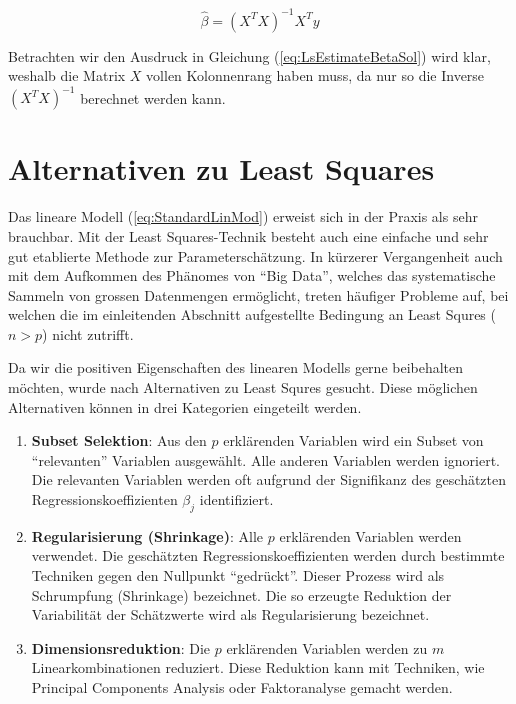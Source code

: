 \documentclass[]{book}
\providecommand{\tightlist}{%
  \setlength{\itemsep}{0pt}\setlength{\parskip}{0pt}}
\begin{document}
\begin{equation}
\hat{\beta} = (X^TX)^{-1}X^Ty
\label{eq:LsEstimateBetaSol}
\end{equation}

Betrachten wir den Ausdruck in Gleichung (\ref{eq:LsEstimateBetaSol})
wird klar, weshalb die Matrix \(X\) vollen Kolonnenrang haben muss, da
nur so die Inverse \((X^TX)^{-1}\) berechnet werden kann.

\section{Alternativen zu Least
Squares}\label{alternativen-zu-least-squares}

Das lineare Modell (\ref{eq:StandardLinMod}) erweist sich in der Praxis
als sehr brauchbar. Mit der Least Squares-Technik besteht auch eine
einfache und sehr gut etablierte Methode zur Parameterschätzung. In
kürzerer Vergangenheit auch mit dem Aufkommen des Phänomes von ``Big
Data'', welches das systematische Sammeln von grossen Datenmengen
ermöglicht, treten häufiger Probleme auf, bei welchen die im
einleitenden Abschnitt aufgestellte Bedingung an Least Squres
(\(n > p\)) nicht zutrifft.

Da wir die positiven Eigenschaften des linearen Modells gerne
beibehalten möchten, wurde nach Alternativen zu Least Squres gesucht.
Diese möglichen Alternativen können in drei Kategorien eingeteilt
werden.

\begin{enumerate}
\def\labelenumi{\arabic{enumi}.}
\tightlist
\item
  \textbf{Subset Selektion}: Aus den \(p\) erklärenden Variablen wird
  ein Subset von ``relevanten'' Variablen ausgewählt. Alle anderen
  Variablen werden ignoriert. Die relevanten Variablen werden oft
  aufgrund der Signifikanz des geschätzten Regressionskoeffizienten
  \(\beta_j\) identifiziert.
\item
  \textbf{Regularisierung (Shrinkage)}: Alle \(p\) erklärenden Variablen
  werden verwendet. Die geschätzten Regressionskoeffizienten werden
  durch bestimmte Techniken gegen den Nullpunkt ``gedrückt''. Dieser
  Prozess wird als Schrumpfung (Shrinkage) bezeichnet. Die so erzeugte
  Reduktion der Variabilität der Schätzwerte wird als Regularisierung
  bezeichnet.
\item
  \textbf{Dimensionsreduktion}: Die \(p\) erklärenden Variablen werden
  zu \(m\) Linearkombinationen reduziert. Diese Reduktion kann mit
  Techniken, wie Principal Components Analysis oder Faktoranalyse
  gemacht werden.
\end{enumerate}
\end{document}
